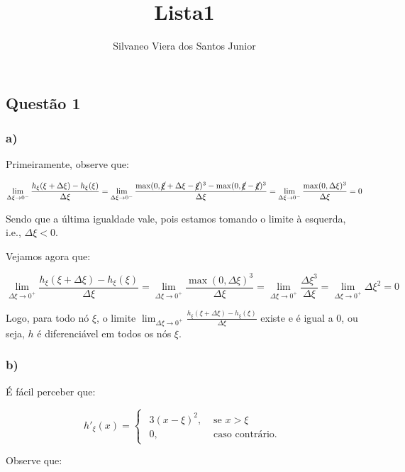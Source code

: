 \documentclass[
]{article}
\title{Lista1}
\author{Silvaneo Viera dos Santos Junior}
\date{}
\begin{document}
\maketitle

\hypertarget{questuxe3o-1}{%
\subsection{Questão 1}\label{questuxe3o-1}}

\hypertarget{a}{%
\subsubsection{a)}\label{a}}

Primeiramente, observe que:

\[
\lim_{\Delta \xi \rightarrow0^-}\frac{h_\xi(\xi+\Delta \xi)-h_\xi(\xi)}{\Delta \xi}=\lim_{\Delta \xi \rightarrow0^-}\frac{\max(0,\cancel{\xi}+\Delta \xi-\cancel{\xi})^3-\max(0,\cancel{\xi}-\cancel{\xi})^3}{\Delta \xi}=\lim_{\Delta \xi \rightarrow0^-}\frac{\max(0,\Delta \xi)^3}{\Delta \xi}=0
\]

Sendo que a última igualdade vale, pois estamos tomando o limite à
esquerda, i.e., \(\Delta \xi<0\).

Vejamos agora que:

\[
\lim_{\Delta \xi \rightarrow0^+}\frac{h_\xi(\xi+\Delta \xi)-h_\xi(\xi)}{\Delta \xi}=\lim_{\Delta \xi \rightarrow0^+}\frac{\max(0,\Delta \xi)^3}{\Delta \xi}=\lim_{\Delta \xi \rightarrow0^+}\frac{\Delta \xi^3}{\Delta \xi}=\lim_{\Delta \xi \rightarrow0^+}\Delta \xi^2=0
\]

Logo, para todo nó \(\xi\), o limite
\(\lim_{\Delta \xi \rightarrow0^+}\frac{h_\xi(\xi+\Delta \xi)-h_\xi(\xi)}{\Delta \xi}\)
existe e é igual a \(0\), ou seja, \(h\) é diferenciável em todos os nós
\(\xi\).

\hypertarget{b}{%
\subsubsection{b)}\label{b}}

É fácil perceber que:

\[
h'_\xi(x)=
\begin{cases}
\begin{aligned}
3(x-\xi)^2,&\text{ se }x>\xi\\
0,&\text{ caso contrário.}
\end{aligned}
\end{cases}
\]

Observe que:
\end{document}
